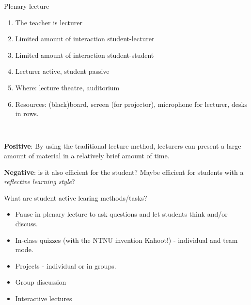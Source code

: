\documentclass[ignorenonframetext,]{beamer}
\providecommand{\tightlist}{%
  \setlength{\itemsep}{0pt}\setlength{\parskip}{0pt}}
\begin{document}
\begin{frame}

\begin{block}{Plenary lecture}

\begin{enumerate}
\def\labelenumi{\arabic{enumi})}
\tightlist
\item
  The teacher is lecturer
\item
  Limited amount of interaction student-lecturer
\item
  Limited amount of interaction student-student
\item
  Lecturer active, student passive
\item
  Where: lecture theatre, auditorium
\item
  Resources: (black)board, screen (for projector), microphone for
  lecturer, desks in rows.
\end{enumerate}

~

\textbf{Positive}: By using the traditional lecture method, lecturers
can present a large amount of material in a relatively brief amount of
time.

\textbf{Negative}: is it also efficient for the student? Maybe efficient
for students with a \emph{reflective learning style}?

\end{block}

\end{frame}

\begin{frame}

\begin{block}{What are student active learing methods/tasks?}

\begin{itemize}
\tightlist
\item
  Pause in plenary lecture to ask questions and let students think
  and/or discuss.
\item
  In-class quizzes (with the NTNU invention Kahoot!) - individual and
  team mode.
\item
  Projects - individual or in groups.
\item
  Group discussion
\item
  Interactive lectures
\end{itemize}

\end{block}

\end{frame}
\end{document}
